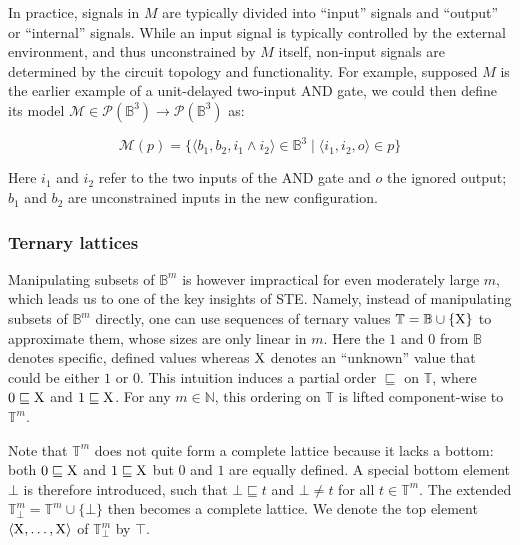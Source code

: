 In practice, signals in $M$ are typically divided into ``input'' signals and ``output'' or ``internal'' signals. While an input signal is typically controlled by the external environment, and thus unconstrained by $M$ itself, non-input signals are determined by the circuit topology and functionality. For example, supposed $M$ is the earlier example of a unit-delayed two-input AND gate, we could then define its model $\mathcal{M} \in \mathcal{P}(\mathbb{B}^{3}) \rightarrow \mathcal{P}(\mathbb{B}^{3})$ as:


\begin{equation*}
\mathcal{M}(p) = \{ \langle b_{1}, b_{2}, i_{1} \wedge i_{2} \rangle \in \mathbb{B}^{3} \mid \langle i_{1}, i_{2}, o \rangle \in p \}
\end{equation*}

\noindent Here $i_{1}$ and $i_{2}$ refer to the two inputs of the AND gate and $o$ the ignored output; $b_{1}$ and $b_{2}$ are unconstrained inputs in the new configuration.

\subsubsection{Ternary lattices}

Manipulating subsets of $\mathbb{B}^{m}$ is however impractical for even moderately large $m$, which leads us to one of the key insights of STE. Namely, instead of manipulating subsets of $\mathbb{B}^{m}$ directly, one can use sequences of ternary values $\mathbb{T} = \mathbb{B} \cup \{ \mathrm{X} \} $ to approximate them, whose sizes are only linear in $m$. Here the $1$ and $0$ from $\mathbb{B}$ denotes specific, defined values whereas $\mathrm{X}$ denotes an ``unknown'' value that could be either $1$ or $0$. This intuition induces a partial order $\sqsubseteq$ on $\mathbb{T}$, where $0 \sqsubseteq \mathrm{X}$ and $1 \sqsubseteq \mathrm{X}$\footnotemark. For any $m \in \mathbb{N}$, this ordering on $\mathbb{T}$ is lifted component-wise to $\mathbb{T}^{m}$.



Note that $\mathbb{T}^{m}$ does not quite form a complete lattice because it lacks a bottom: both $0 \sqsubseteq \mathrm{X}$ and $1 \sqsubseteq \mathrm{X}$ but $0$ and $1$ are equally defined. A special bottom element $\bot$ is therefore introduced, such that $\bot \sqsubseteq t$ and $\bot \neq t$ for all $t \in \mathbb{T}^{m}$. The extended $\mathbb{T}_{\bot}^{m} = \mathbb{T}^{m} \cup \{ \bot \}$ then becomes a complete lattice. We denote the top element $\langle \mathrm{X}, \dots, \mathrm{X} \rangle$ of $\mathbb{T}_{\bot}^{m}$ by $\top$.

